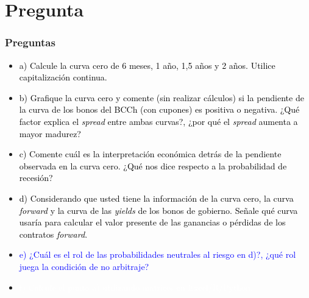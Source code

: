 \documentclass{beamer}
\begin{document}
\section{Pregunta }
\begin{frame}
  \frametitle{Preguntas}
  \begin{itemize}
    \scriptsize
    \item {\textcolor{black}{a) Calcule la curva cero de 6 meses, 1 año, 1,5 años y 2 años. Utilice capitalización continua.}}
    \vspace{3pt}
    \item {\textcolor{black}{b) Grafique la curva cero y comente (sin realizar cálculos) si la pendiente de la curva de los bonos del BCCh (con cupones) es positiva o negativa. ¿Qué factor explica el \textit{spread} entre ambas curvas?, ¿por qué el \textit{spread} aumenta a mayor madurez?}}
    \vspace{3pt}
    \item {\textcolor{black}{c) Comente cuál es la interpretación económica detrás de la pendiente observada en la curva cero. ¿Qué nos dice respecto a la probabilidad de recesión?}}
    \vspace{3pt}
    \item {\textcolor{black}{d) Considerando que usted tiene la información de la curva cero, la curva \textit{forward} y la curva de las \textit{yields} de los bonos de gobierno. Señale qué curva usaría para calcular el valor presente de las ganancias o pérdidas de los contratos \textit{forward}.}}
    \vspace{3pt}
    \item {\Large\textcolor{blue}{e) ¿Cuál es el rol de las probabilidades neutrales al riesgo en d)?, ¿qué rol juega la condición de no arbitraje?}}
    \vspace{3pt}
    \item {\textcolor{white}{f) Calcule el punto a) utilizando matrices en Excel/R/Python.}}
    \vspace{3pt}
  \end{itemize}
\end{frame}
\end{document}
